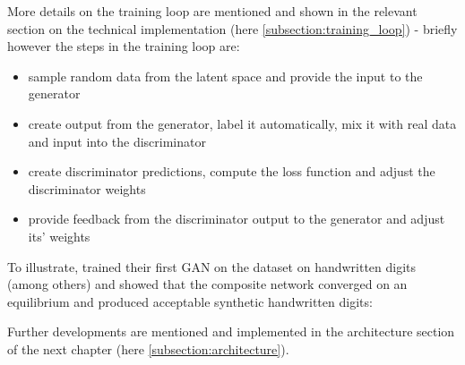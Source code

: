 More details on the training loop are mentioned and shown in the relevant section on the technical implementation (here \ref{subsection:training_loop}) - briefly however the steps in the training loop are:

\begin{itemize}
	\item sample random data from the latent space and provide the input to the generator
	\item create output from the generator, label it automatically, mix it with real data and input into the discriminator
	\item create discriminator predictions, compute the loss function and adjust the discriminator weights
	\item provide feedback from the discriminator output to the generator and adjust its' weights
\end{itemize}

\clearpage

To illustrate, \cite{goodfellow2014generative} trained their first \ac{GAN} on the \cite{mnist} dataset on handwritten digits (among others) and showed that the composite network converged on an equilibrium and produced acceptable synthetic handwritten digits:


Further developments are mentioned and implemented in the architecture section of the next chapter (here \ref{subsection:architecture}).

